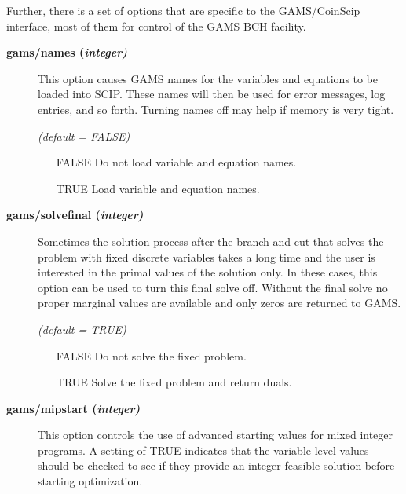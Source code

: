 Further, there is a set of options that are specific to the GAMS/CoinScip interface, most of them for control of the GAMS BCH facility.

\begin{description}
\item[\label{scipnames}\hypertarget{scipnames}
{\textbf{gams/names (\slshape{integer})}}]\hspace{1.0in}

This option causes GAMS names for the variables and equations to be loaded into SCIP.
These names will then be used for error messages, log entries, and so forth.
Turning names off may help if memory is very tight.

\textsl{(default = FALSE)}
\begin{itemize}
\item[FALSE] Do not load variable and equation names.
\item[TRUE] Load variable and equation names.
\end{itemize}


\item[\label{scipsolvefinal}\hypertarget{scipsolvefinal}
{\textbf{gams/solvefinal (\slshape{integer})}}]\hspace{1.0in}

Sometimes the solution process after the branch-and-cut that solves the problem with fixed discrete variables takes a long time and the user is interested in the primal values of the solution only.
In these cases, this option can be used to turn this final solve off.
Without the final solve no proper marginal values are available and only zeros are returned to GAMS.

\textsl{(default = TRUE)}
\begin{itemize}
\item[FALSE] Do not solve the fixed problem.
\item[TRUE] Solve the fixed problem and return duals.
\end{itemize}


\item[\label{scipmipstart}\hypertarget{scipmipstart}
{\textbf{gams/mipstart (\slshape{integer})}}]\hspace{1.0in}

This option controls the use of advanced starting values for mixed integer programs.
A setting of TRUE indicates that the variable level values should be checked to see if they provide an integer feasible solution before starting optimization.


\end{description}
